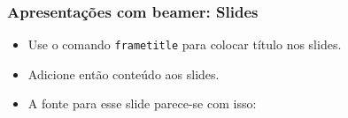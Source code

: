 \begin{frame}
  \frametitle{Apresentações com beamer: Slides}
  \begin{itemize}
		\item Use o comando \texttt{frametitle} para colocar 
              título nos slides.
		\item Adicione então conteúdo aos slides.
		\item A fonte para esse slide parece-se com isso:
  \end{itemize}
\end{frame}

